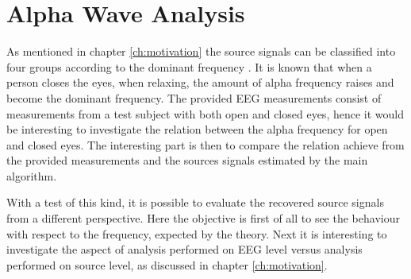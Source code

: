 \section{Alpha Wave Analysis}\label{sec:alpha_test}
As mentioned in chapter \ref{ch:motivation} the source signals can be classified into four groups according to the dominant frequency \cite{EEGsignalprocessing}. It is known that when a person closes the eyes, when relaxing, the amount of alpha frequency raises and become the dominant frequency. 
The provided EEG measurements consist of measurements from a test subject with both open and closed eyes, hence it would be interesting to investigate the relation between the alpha frequency for open and closed eyes. The interesting part is then to compare the relation achieve from the provided measurements and the sources signals estimated by the main algorithm.

With a test of this kind, it is possible to evaluate the recovered source signals from a different perspective. Here the objective is first of all to see the behaviour with respect to the frequency, expected by the theory. Next it is interesting to investigate the aspect of analysis performed on EEG level versus analysis performed on source level, as discussed in chapter \ref{ch:motivation}.              

